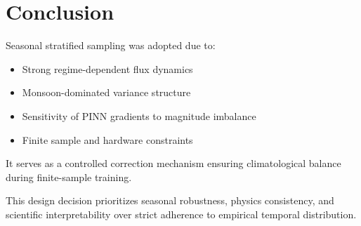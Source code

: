 \documentclass[12pt]{article}
\begin{document}
\section{Conclusion}

Seasonal stratified sampling was adopted due to:

\begin{itemize}
    \item Strong regime-dependent flux dynamics
    \item Monsoon-dominated variance structure
    \item Sensitivity of PINN gradients to magnitude imbalance
    \item Finite sample and hardware constraints
\end{itemize}

It serves as a controlled correction mechanism ensuring climatological balance during finite-sample training.

This design decision prioritizes seasonal robustness, physics consistency, and scientific interpretability over strict adherence to empirical temporal distribution.
\end{document}
